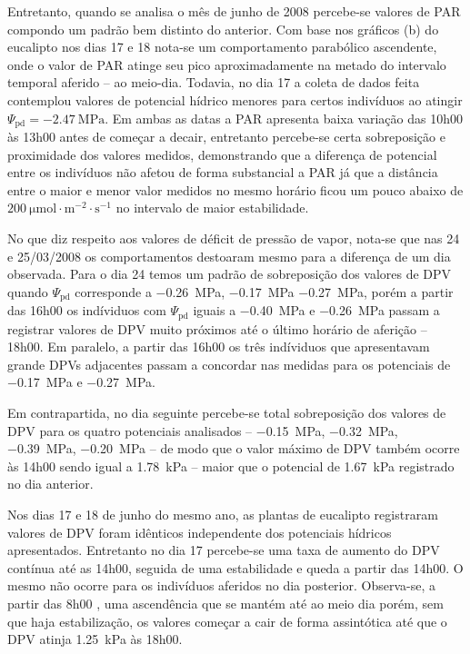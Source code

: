 \documentclass[a4paper, 12pt]{article}
\numberwithin{equation}{section}
\begin{document}
	Entretanto, quando se analisa o mês de junho de 2008 percebe-se valores de PAR compondo um padrão bem distinto do anterior. Com base nos gráficos (b) do eucalipto nos dias 17 e 18 nota-se um comportamento parabólico ascendente, onde o valor de PAR atinge seu pico aproximadamente na metado do intervalo temporal aferido -- ao meio-dia. Todavia, no dia 17 a coleta de dados feita contemplou valores de potencial hídrico menores para certos indivíduos ao atingir $\Psi_{\textrm{pd}}=\SI{-2.47}{\mega\pascal}$. Em ambas as datas a PAR apresenta baixa variação das 10h00 às 13h00 antes de começar a decair, entretanto percebe-se certa sobreposição e proximidade dos valores medidos, demonstrando que a diferença de potencial entre os indivíduos não afetou de forma substancial a PAR já que a distância entre o maior e menor valor medidos no mesmo horário ficou um pouco abaixo de $\SI{200}{\micro\mole\cdot\meter^{-2}\cdot\second^{-1}}$ no intervalo de maior estabilidade.
	
	No que diz respeito aos valores de déficit de pressão de vapor, nota-se que nas 24 e 25/03/2008 os comportamentos destoaram mesmo para a diferença de um dia observada. Para o dia 24 temos um padrão de sobreposição dos valores de DPV quando $\Psi_{\textrm{pd}}$ corresponde a \SI{-.26}{\mega\pascal}, \SI{-.17}{\mega\pascal} \SI{-.27}{\mega\pascal}, porém a partir das 16h00 os indíviduos com $\Psi_{\textrm{pd}}$ iguais a \SI{-.40}{\mega\pascal} e \SI{-.26}{\mega\pascal} passam a registrar valores de DPV muito próximos até o último horário de aferição -- 18h00. Em paralelo, a partir das 16h00 os três indíviduos que apresentavam grande DPVs adjacentes passam a concordar nas medidas para os potenciais de \SI{-.17}{\mega\pascal} e \SI{-.27}{\mega\pascal}.
	
	Em contrapartida, no dia seguinte percebe-se total sobreposição dos valores de DPV para os quatro potenciais analisados -- \SI{-.15}{\mega\pascal}, \SI{-.32}{\mega\pascal}, \SI{-.39}{\mega\pascal}, \SI{-.20}{\mega\pascal} -- de modo que o valor máximo de DPV também ocorre às 14h00 sendo igual a \SI{1.78}{\kilo\pascal} -- maior que o potencial de \SI{1.67}{\kilo\pascal} registrado no dia anterior.
	
	Nos dias 17 e 18 de junho do mesmo ano, as plantas de eucalipto registraram valores de DPV foram idênticos independente dos potenciais hídricos apresentados. Entretanto no dia 17 percebe-se uma taxa de aumento do DPV contínua até as 14h00, seguida de uma estabilidade e queda a partir das 14h00. O mesmo não ocorre para os indivíduos aferidos no dia posterior. Observa-se, a partir das 8h00 , uma ascendência que se mantém até ao meio dia porém, sem que haja estabilização, os valores começar a cair de forma assintótica até que o DPV atinja \SI{1.25}{\kilo\pascal} às 18h00. 
	
\end{document}
